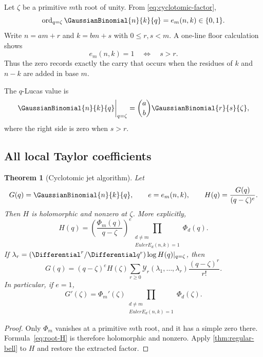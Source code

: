 \documentclass[11pt,oneside]{article}
\newtheorem{theorem}{Theorem}[section]
\theoremstyle{definition}
\theoremstyle{remark}
\newcommand{\ord}{\operatorname{ord}}
\newcommand{\Bell}{\mathcal Y}
\let\reportsubsection\subsection
\let\section\reportsubsection
\begin{document}
Let $\zeta$ be a primitive $m$th root of unity.  From
\eqref{eq:cyclotomic-factor},
\begin{equation}\label{eq:root-order}
 \ord_{q=\zeta}\GaussianBinomial{n}{k}{q}=e_m(n,k)\in\{0,1\}.
\end{equation}
Write $n=am+r$ and $k=bm+s$ with $0\le r,s<m$.  A one-line floor calculation
shows
\begin{equation}\label{eq:carry-criterion}
 e_m(n,k)=1\quad\Longleftrightarrow\quad s>r.
\end{equation}
Thus the zero records exactly the carry that occurs when the residues of $k$
and $n-k$ are added in base $m$.

The $q$-Lucas value is
\begin{equation}\label{eq:q-lucas-root}
 \GaussianBinomial{n}{k}{q}\bigg|_{q=\zeta}
 =\binom ab\GaussianBinomial{r}{s}{\zeta},
\end{equation}
where the right side is zero when $s>r$.

\section{All local Taylor coefficients}

\begin{theorem}[Cyclotomic jet algorithm]\label{thm:cyclotomic-jets}
Let
\[
 G(q)=\GaussianBinomial{n}{k}{q},
 \qquad e=e_m(n,k),
 \qquad H(q)=\frac{G(q)}{(q-\zeta)^e}.
\]
Then $H$ is holomorphic and nonzero at $\zeta$.  More explicitly,
\begin{equation}\label{eq:root-H}
 H(q)=
 \left(\frac{\Phi_m(q)}{q-\zeta}\right)^e
 \prod_{\substack{d\ne m\\EulerE_d(n,k)=1}}\Phi_d(q).
\end{equation}
If
\(
\lambda_r=(\Differential^r/\Differential q^r)\log H(q)|_{q=\zeta}
\), then
\begin{equation}\label{eq:root-jet-bell}
 G(q)=(q-\zeta)^eH(\zeta)
 \sum_{r\ge0}\Bell_r(\lambda_1,\ldots,\lambda_r)
 \frac{(q-\zeta)^r}{r!}.
\end{equation}
In particular, if $e=1$,
\begin{equation}\label{eq:root-leading-derivative}
 G'(\zeta)=\Phi_m'(\zeta)
 \prod_{\substack{d\ne m\\EulerE_d(n,k)=1}}\Phi_d(\zeta).
\end{equation}
\end{theorem}

\begin{proof}
Only $\Phi_m$ vanishes at a primitive $m$th root, and it has a simple zero
there.  Formula~\eqref{eq:root-H} is therefore holomorphic and nonzero.
Apply \cref{thm:regular-bell} to $H$ and restore the extracted factor.
\end{proof}
\end{document}
